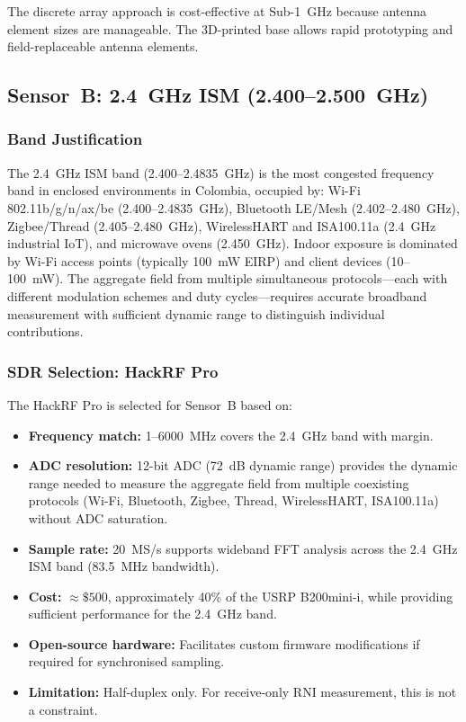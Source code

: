 \documentclass[11pt,a4paper]{article}
\begin{document}
\noindent The discrete array approach is cost-effective at Sub-1~GHz because antenna element sizes are manageable. The 3D-printed base allows rapid prototyping and field-replaceable antenna elements.

\subsection{Sensor~B: 2.4~GHz ISM (2.400--2.500~GHz)}

\subsubsection{Band Justification}

The 2.4~GHz ISM band (2.400--2.4835~GHz) is the most congested frequency band in enclosed environments in Colombia, occupied by: Wi-Fi 802.11b/g/n/ax/be (2.400--2.4835~GHz), Bluetooth LE/Mesh (2.402--2.480~GHz), Zigbee/Thread (2.405--2.480~GHz), WirelessHART and ISA100.11a (2.4~GHz industrial IoT), and microwave ovens (2.450~GHz). Indoor exposure is dominated by Wi-Fi access points (typically 100~mW EIRP) and client devices (10--100~mW). The aggregate field from multiple simultaneous protocols---each with different modulation schemes and duty cycles---requires accurate broadband measurement with sufficient dynamic range to distinguish individual contributions.

\subsubsection{SDR Selection: HackRF Pro}

The HackRF Pro is selected for Sensor~B based on:

\begin{itemize}
    \item \textbf{Frequency match:} 1--6000~MHz covers the 2.4~GHz band with margin.
    \item \textbf{ADC resolution:} 12-bit ADC (72~dB dynamic range) provides the dynamic range needed to measure the aggregate field from multiple coexisting protocols (Wi-Fi, Bluetooth, Zigbee, Thread, WirelessHART, ISA100.11a) without ADC saturation.
    \item \textbf{Sample rate:} 20~MS/s supports wideband FFT analysis across the 2.4~GHz ISM band (83.5~MHz bandwidth).
    \item \textbf{Cost:} $\approx \$500$, approximately 40\% of the USRP B200mini-i, while providing sufficient performance for the 2.4~GHz band.
    \item \textbf{Open-source hardware:} Facilitates custom firmware modifications if required for synchronised sampling.
    \item \textbf{Limitation:} Half-duplex only. For receive-only RNI measurement, this is not a constraint.
\end{itemize}
\end{document}
